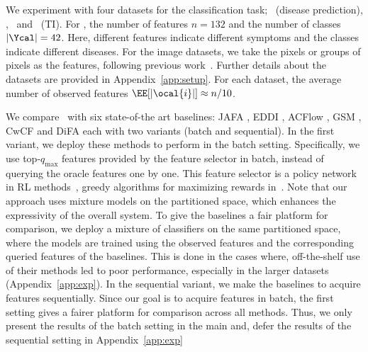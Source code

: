 \documentclass[letterpaper]{article}
\renewcommand{\cite}{\citep}
\begin{document}
We experiment with four datasets for the classification task; \dpr\ (disease prediction), \mnist, \cifar\ and \ti\ (TI).
For \dpr, the number of features $n=132$ and the number of classes $|\Ycal|=42$. Here, different features indicate different symptoms and the classes indicate different diseases. For the image datasets, we take the pixels or groups of pixels as the features, following previous work~\cite{acflow,gsm}.
Further details about the datasets are provided in Appendix~\ref{app:setup}.
For each dataset, the average number of observed features $\EE[|\ocal{i}|] \approx n/10$.


We compare \our\ with six state-of-the art baselines: JAFA \cite{jafa}, EDDI \cite{eddi}, ACFlow \cite{acflow}, GSM \cite{gsm}, CwCF \cite{cwcf} and DiFA \cite{difa} each
with two variants  (batch and sequential).
In the first variant, we deploy these methods to perform in the batch setting. Specifically, we use top-$q_{\max}$ features provided by the feature selector in batch, instead of querying the oracle features one by one.  This feature selector is a policy network in RL methods~\cite{gsm,jafa,cwcf,difa}, greedy algorithms for maximizing rewards in~\cite{eddi,acflow}.
Note that our approach uses mixture models on the partitioned space, which enhances the expressivity of the overall
system. To give the baselines a fair platform for comparison, we deploy a mixture of classifiers on the same partitioned space, where the models are trained using the observed features and the corresponding queried features of the baselines.  This is done in the cases where, off-the-shelf use of their methods led to poor performance, especially in the larger datasets (Appendix~\ref{app:exp}).
In the sequential variant, we make the baselines to acquire features sequentially.
Since our goal is to acquire features in batch, the first setting gives a fairer platform for comparison across all methods. Thus, we only present the results of the batch setting in the main and, defer the results of the sequential setting in Appendix~\ref{app:exp}
\end{document}
